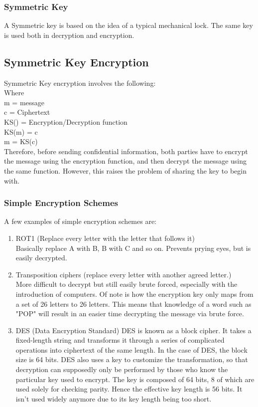 \documentclass{article}
\begin{document}
\subsubsection{Symmetric Key}
A Symmetric key is based on the idea of a typical mechanical lock. The same key is used both in decryption and encryption.
\subsection{Symmetric Key Encryption}
Symmetric Key encryption involves the following: \\
Where\\
m = message\\
c = Ciphertext\\
KS() = Encryption/Decryption function\\
KS(m) = c\\
m = KS(c)\\
Therefore, before sending confidential information, both parties have to encrypt the message using the encryption function, and then decrypt the message using the same function. However, this raises the problem of sharing the key to begin with.
\subsubsection{Simple Encryption Schemes}
A few examples of simple encryption schemes are:
\begin{enumerate}
    \item ROT1 (Replace every letter with the letter that follows it)\\
    Basically replace A with B, B with C and so on. Prevents prying eyes, but is easily decrypted.
    \item Transposition ciphers (replace every letter with another agreed letter.) \\
    More difficult to decrypt but still easily brute forced, especially with the introduction of computers.
    Of note is how the encryption key only maps from a set of 26 letters to 26 letters. This means that knowledge of a word such as "POP" will result in an easier time decrypting the message via brute force. 
    \item DES (Data Encryption Standard)
    DES is known as a block cipher. It takes a fixed-length string and transforms it through a series of complicated operations into ciphertext of the same length. In the case of DES, the block size is 64 bits. DES also uses a key to customize the transformation, so that decryption can supposedly only be performed by those who know the particular key used to encrypt. The key is composed of 64 bits, 8 of which are used solely for checking parity. Hence the effective key length is 56 bits. It isn't used widely anymore due to its key length being too short.
\end{enumerate}
\end{document}
